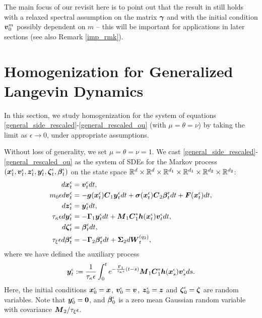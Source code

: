 \begin{remark}
\begin{itemize}
The main focus of our revisit here is to point out that the result in \cite{hottovy2015smoluchowski} still holds with a relaxed spectral assumption on the matrix $\boldsymbol{\gamma}$ and with the initial condition $\boldsymbol{v}_0^m$ possibly dependent on $m$ -- this will be important for applications in later sections (see also Remark \ref{imp_rmk}).  
\end{itemize}
\end{remark}


\section{Homogenization for Generalized Langevin Dynamics} \label{general_homog}

In this section, we study homogenization for the system of equations \eqref{general_side_rescaled}-\eqref{general_rescaled_ou}  (with $\mu = \theta = \nu$) by taking the limit as $\epsilon \to 0$, under appropriate assumptions.

Without loss of generality, we set $\mu = \theta = \nu = 1$. We cast \eqref{general_side_rescaled}-\eqref{general_rescaled_ou} as the system of SDEs for the Markov process $(\boldsymbol{x}^\epsilon_{t}, \boldsymbol{v}^\epsilon_{t}, \boldsymbol{z}^\epsilon_{t}, \boldsymbol{y}^\epsilon_{t}, \boldsymbol{\zeta}^\epsilon_{t}, \boldsymbol{\beta}^\epsilon_{t})$ on the state space $\mathbb{R}^{d}\times \mathbb{R}^d \times \mathbb{R}^{d_1} \times \mathbb{R}^{d_1} \times \mathbb{R}^{d_2} \times \mathbb{R}^{d_2}$:
\begin{align}
d\boldsymbol{x}^\epsilon_{t} &= \boldsymbol{v}^\epsilon_{t} dt, \label{sdec1} \\ 
m_{0} \epsilon  d\boldsymbol{v}^\epsilon_{t} &=  - \boldsymbol{g}(\boldsymbol{x}^\epsilon_{t}) \boldsymbol{C}_1 \boldsymbol{y}^\epsilon_{t} dt + \boldsymbol{\sigma}(\boldsymbol{x}^\epsilon_{t}) \boldsymbol{C}_2 \boldsymbol{\beta}^\epsilon_{t} dt +\boldsymbol{F}(\boldsymbol{x}^\epsilon_{t})dt, \\ 
d \boldsymbol{z}^\epsilon_{t} &= \boldsymbol{y}^\epsilon_{t} dt, \\ 
\tau_{\kappa} \epsilon  d\boldsymbol{y}^\epsilon_{t} &= -\boldsymbol{\Gamma}_1 \boldsymbol{y}^\epsilon_{t} dt + \boldsymbol{M}_1 \boldsymbol{C}_1^* \boldsymbol{h}(\boldsymbol{x}^\epsilon_{t}) \boldsymbol{v}^\epsilon_{t} dt, \\ 
d\boldsymbol{\zeta}^\epsilon_{t} &= \boldsymbol{\beta}^\epsilon_{t} dt, \\ 
\tau_{\xi} \epsilon d\boldsymbol{\beta}^\epsilon_{t} &= -\boldsymbol{\Gamma}_2 \boldsymbol{\beta}^\epsilon_{t} dt +  \boldsymbol{\Sigma}_2 d\boldsymbol{W}^{(q_2)}_{t}, \label{sdec6}
\end{align}
where we have defined the auxiliary process 
\begin{equation}
\boldsymbol{y}^\epsilon_{t} := \frac{1}{\tau_{\kappa} \epsilon} \int_{0}^{t} e^{-\frac{\boldsymbol{\Gamma}_1}{\tau_{\kappa} \epsilon}(t-s)} \boldsymbol{M}_1 \boldsymbol{C}_1^* \boldsymbol{h}(\boldsymbol{x}^\epsilon_{s}) \boldsymbol{v}^\epsilon_{s} ds.
\end{equation}
Here, the initial conditions $\boldsymbol{x}^\epsilon_0 = \boldsymbol{x}$, $\boldsymbol{v}^\epsilon_0 = \boldsymbol{v}$, $\boldsymbol{z}^\epsilon_0 = \boldsymbol{z}$ and $\boldsymbol{\zeta}^\epsilon_0 = \boldsymbol{\zeta}$ are random variables.  Note that $\boldsymbol{y}^\epsilon_0 = \boldsymbol{0}$, and $\boldsymbol{\beta}^\epsilon_0$ is a zero mean Gaussian random variable with covariance $\boldsymbol{M}_2/\tau_\xi \epsilon$. 

